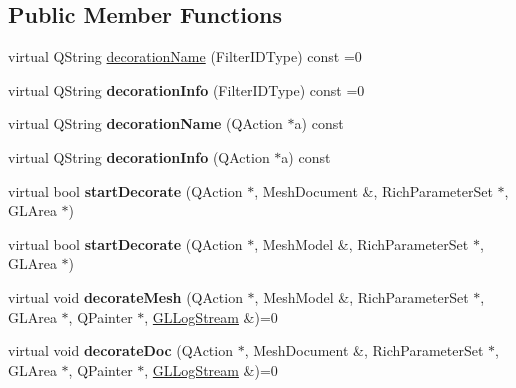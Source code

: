 \subsection*{Public Member Functions}
\begin{DoxyCompactItemize}
\item 
virtual Q\+String \hyperlink{class_mesh_decorate_interface_aed4eb195ecbf0f7e35dae555c8e6d1e7}{decoration\+Name} (Filter\+I\+D\+Type) const =0
\item 
\mbox{\label{class_mesh_decorate_interface_a4cd711507f45dfe4a375507bad4baa77}} 
virtual Q\+String {\bfseries decoration\+Info} (Filter\+I\+D\+Type) const =0
\item 
\mbox{\label{class_mesh_decorate_interface_ae96698bbcfcc94d199717208f7eaf1bb}} 
virtual Q\+String {\bfseries decoration\+Name} (Q\+Action $\ast$a) const
\item 
\mbox{\label{class_mesh_decorate_interface_aa438df3dc804a4a9f0f63b2645f50600}} 
virtual Q\+String {\bfseries decoration\+Info} (Q\+Action $\ast$a) const
\item 
\mbox{\label{class_mesh_decorate_interface_ae77e62cd488e1f54e9689904ef978b58}} 
virtual bool {\bfseries start\+Decorate} (Q\+Action $\ast$, Mesh\+Document \&, Rich\+Parameter\+Set $\ast$, G\+L\+Area $\ast$)
\item 
\mbox{\label{class_mesh_decorate_interface_a340823964c2ceb6ab74248ce39823fc2}} 
virtual bool {\bfseries start\+Decorate} (Q\+Action $\ast$, Mesh\+Model \&, Rich\+Parameter\+Set $\ast$, G\+L\+Area $\ast$)
\item 
\mbox{\label{class_mesh_decorate_interface_a0f3360a354b8cead3acd6486823a79f5}} 
virtual void {\bfseries decorate\+Mesh} (Q\+Action $\ast$, Mesh\+Model \&, Rich\+Parameter\+Set $\ast$, G\+L\+Area $\ast$, Q\+Painter $\ast$, \hyperlink{class_g_l_log_stream}{G\+L\+Log\+Stream} \&)=0
\item 
\mbox{\label{class_mesh_decorate_interface_ac45a3f2a8ebb0cc98f8c4d26d11a679f}} 
virtual void {\bfseries decorate\+Doc} (Q\+Action $\ast$, Mesh\+Document \&, Rich\+Parameter\+Set $\ast$, G\+L\+Area $\ast$, Q\+Painter $\ast$, \hyperlink{class_g_l_log_stream}{G\+L\+Log\+Stream} \&)=0

\end{DoxyCompactItemize}
